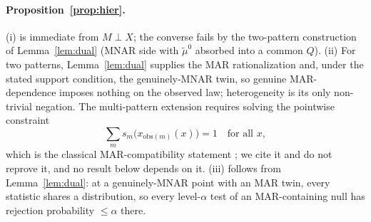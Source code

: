 \documentclass[conference]{IEEEtran}
\begin{document}
\paragraph{Proposition~\ref{prop:hier}.}
(i) is immediate from $M\perp X$; the converse fails by the two-pattern construction of
Lemma~\ref{lem:dual} (MNAR side with $\tilde\mu^0$ absorbed into a common $Q$).
(ii) For two patterns, Lemma~\ref{lem:dual} supplies the MAR rationalization and, under
the stated support condition, the genuinely-MNAR twin, so genuine MAR-dependence imposes
nothing on the observed law; heterogeneity is its only non-trivial negation. The
multi-pattern extension requires solving the pointwise constraint
\begin{equation}
\sum_m s_m\bigl(x_{\mathrm{obs}(m)}(x)\bigr)=1 \quad \text{for all } x,
\label{eq:proof_multipattern}
\end{equation}
which is the classical MAR-compatibility statement \cite{rubin1976,mk2007}; we cite it
and do not reprove it, and no result below depends on it.
(iii) follows from Lemma~\ref{lem:dual}: at a genuinely-MNAR point with an MAR twin,
every statistic shares a distribution, so every level-$\alpha$ test of an MAR-containing
null has rejection probability $\le\alpha$ there.
\end{document}
